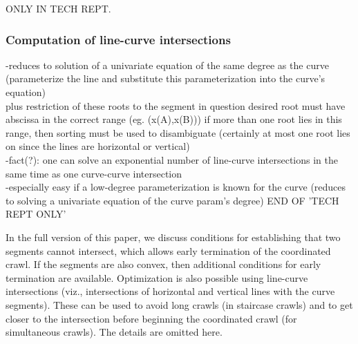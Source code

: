 ONLY IN TECH REPT.
\subsubsection{Computation of line-curve intersections}
%
-reduces to solution of a univariate equation of the same degree as the curve 
	(parameterize the line and substitute this parameterization 
	into the curve's equation)\\
 plus restriction of these roots to the segment in question 
	desired root must have abscissa in the correct range (eg. (x(A),x(B)))
	if more than one root lies in this range, then sorting must be used
		to disambiguate (certainly at most one root lies on 
		since the lines are horizontal or vertical)\\
-fact(?): one can solve an exponential number of line-curve intersections
	in the same time as one curve-curve intersection\\
-especially easy if a low-degree parameterization is known for the curve
	(reduces to solving a univariate equation of the curve param's degree)
END OF 'TECH REPT ONLY'

\else %
In the full version of this paper, we discuss conditions for
establishing that two segments cannot intersect, which allows
early termination of the coordinated crawl.
If the segments are also convex, then additional conditions for early termination
are available.
Optimization is also possible using line-curve intersections (viz., 
intersections of horizontal and vertical lines with the curve segments).
These can be used to avoid long crawls (in staircase crawls)
and to get closer to the intersection before beginning the coordinated crawl
(for simultaneous crawls).
The details are omitted here.
\fi
%
